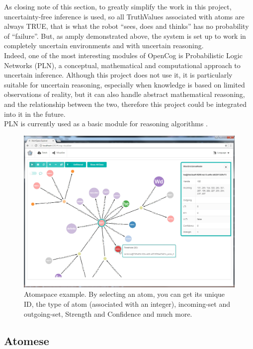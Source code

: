 As closing note of this section, to greatly simplify the work in this project, uncertainty-free inference is used, so all TruthValues associated with atoms are always TRUE, that is what the robot \enquote{sees, does and thinks} has no probability of \enquote{failure}. But, as amply demonstrated above, the system is set up to work in completely uncertain environments and with uncertain reasoning. \\
Indeed, one of the most interesting modules of OpenCog is Probabilistic Logic Networks (PLN), a conceptual, mathematical and computational approach to uncertain inference. Although this project does not use it, it is particularly suitable for uncertain reasoning, especially when knowledge is based on limited observations of reality, but it can also handle abstract mathematical reasoning, and the relationship between the two, therefore this project could be integrated into it in the future. \\
PLN is currently used as a basic module for reasoning algorithms \cite{goertzel2008probabilistic, Goertzel2011RealWorldRT}. 

\begin{figure}[h]
\centering
\includegraphics[width=1.0
\textwidth]{figures/Magistrale/atomspace_explorer}
\caption[AtomSpace Explorer ]{Atomspace example. By selecting an atom, you can get its unique ID, the type of atom (associated with an integer), incoming-set and outgoing-set, Strength and Confidence and much more.
\label{fig:atomspace_explorer}}
\end{figure}


\subsection{Atomese}\label{sec:atomese}

